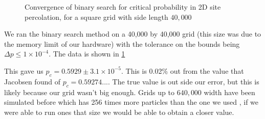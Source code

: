 \documentclass[%
 reprint,
 amsmath,amssymb,
 aps,
]{revtex4-2}
\begin{document}
\begin{figure}
    \centering
    \caption{Convergence of binary search for critical probability in 2D site percolation, for a square grid with side length $40,000$}
    \label{fig:site_critical_point}
\end{figure}

We ran the binary search method on a 40,000 by 40,000 grid (this size was due to the memory limit of our hardware) with the tolerance on the bounds being $\Delta p \leq 1\times 10^{-4}$. The data is shown in \cref{fig:site_critical_point}

This gave us $p_{c} = 0.5929 \pm 3.1\times10^{-5}$. This is 0.02\% out from the value that Jacobsen found of $p_c =  0.59274...$\cite{Jacobsen_2015}. The true value is out side our error, but this is likely because our grid wasn't big enough. Grids up to $640,000$ width have been simulated before which has 256 times more particles than the one we used \cite{rapaport_multi-million_1991}, if we were able to run ones that size we would be able to obtain a closer value.


\end{document}
